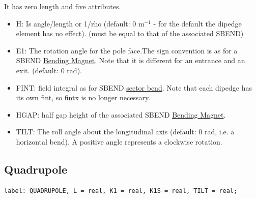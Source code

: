 It has zero length and five attributes. 
\begin{itemize}
   \item H: Is angle/length or 1/rho (default: 0 m$^{-1}$ - for the
     default the dipedge element has no effect). (must be equal to that
     of the associated SBEND)  
   \item E1: The rotation angle for the pole face.The sign convention is
     as for a SBEND \href{bend.html}{Bending Magnet}. Note that it is
     different for an entrance and an exit. (default: 0 rad).  
   \item FINT: field integral as for SBEND
     \href{local_system.html#sbend}{sector bend}. Note that each dipedge
     has its own fint, so fintx is no longer necessary.  
   \item HGAP: half gap height of the associated SBEND
     \href{bend.html}{Bending Magnet}.   
   \item TILT: The roll angle about the longitudinal axis (default: 0
     rad, i.e. a horizontal bend). A positive angle represents a
     clockwise rotation.  
\end{itemize}



%

\subsection{Quadrupole}
\label{sec:quadrupole}

\begin{verbatim}
label: QUADRUPOLE, L = real, K1 = real, K1S = real, TILT = real;
\end{verbatim}    

